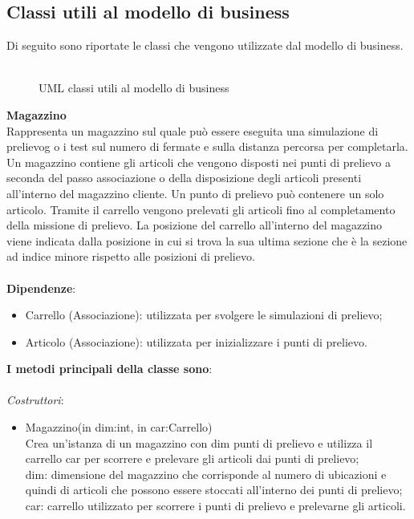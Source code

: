 \subsection{Classi utili al modello di business} %
Di seguito sono riportate le classi che vengono utilizzate dal modello di business.
\\\\
\begin{figure}[!h] 
    \centering 
    \caption{UML classi utili al modello di business}
\end{figure}
\textbf{Magazzino}
\\
Rappresenta un magazzino sul quale può essere eseguita una \gls{simulazione di prelievog} o i
test sul numero di fermate e sulla distanza percorsa per completarla.
Un magazzino contiene gli articoli che vengono disposti nei punti di prelievo a seconda del passo associazione o della disposizione degli articoli presenti all'interno del magazzino cliente.
Un punto di prelievo può contenere un solo articolo.
Tramite il carrello vengono prelevati gli articoli fino al completamento della missione di prelievo.
La posizione del carrello all'interno del magazzino viene indicata dalla posizione in cui si trova la sua ultima sezione che è la sezione ad indice minore rispetto alle posizioni di prelievo.\\\\
\textbf{Dipendenze}:
\begin{itemize}
    \item Carrello (Associazione): utilizzata per svolgere le simulazioni di prelievo;
    \item Articolo (Associazione): utilizzata per inizializzare i punti di prelievo.\\
\end{itemize}
\textbf{I metodi principali della classe sono}:
\\\\
\textit{Costruttori}:
\begin{itemize}
    \item Magazzino(in dim:int, in car:Carrello)\\
    Crea un'istanza di un magazzino con dim punti di prelievo e utilizza il carrello car per scorrere e prelevare gli articoli dai punti di prelievo;\\
    dim: dimensione del magazzino che corrisponde al numero di ubicazioni e quindi di articoli che possono essere stoccati all'interno dei punti di prelievo;\\
    car: carrello utilizzato per scorrere i punti di prelievo e prelevarne gli articoli.\\
\end{itemize}
